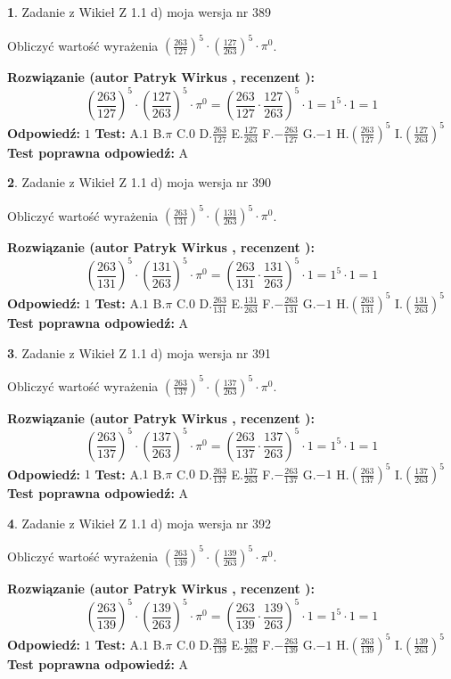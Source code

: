 \documentclass[12pt, a4paper]{article}
\theoremstyle{definition} %
\newtheorem{zad}{}
\newcommand{\zadStart}[1]{\begin{zad}#1\newline}
\newcommand{\zadStop}{\end{zad}}
\newcommand{\rozwStart}[2]{\noindent \textbf{Rozwiązanie (autor #1 , recenzent #2): }\newline}
\newcommand{\rozwStop}{\newline}
\newcommand{\odpStart}{\noindent \textbf{Odpowiedź:}\newline}
\newcommand{\odpStop}{\newline}
\newcommand{\testStart}{\noindent \textbf{Test:}\newline}
\newcommand{\testStop}{\newline}
\newcommand{\kluczStart}{\noindent \textbf{Test poprawna odpowiedź:}\newline}
\newcommand{\kluczStop}{\newline}
\begin{document}
\zadStart{Zadanie z Wikieł Z 1.1 d) moja wersja nr 389}

Obliczyć wartość wyrażenia $(\frac{263}{127})^{5} \cdot (\frac{127}{263})^{5} \cdot \pi^{0}$.
\zadStop
\rozwStart{Patryk Wirkus}{}
$$(\frac{263}{127})^{5} \cdot (\frac{127}{263})^{5} \cdot \pi^{0} = (\frac{263}{127} \cdot \frac{127}{263})^{5} \cdot 1 = 1^{5} \cdot 1 = 1$$
\rozwStop
\odpStart
$1$
\odpStop
\testStart
A.$1$ B.$\pi$ C.$0$ D.$\frac{263}{127}$ E.$\frac{127}{263}$
F.$-\frac{263}{127}$ G.$-1$
H.$(\frac{263}{127})^{5}$
I.$(\frac{127}{263})^{5}$
\testStop
\kluczStart
A
\kluczStop



\zadStart{Zadanie z Wikieł Z 1.1 d) moja wersja nr 390}

Obliczyć wartość wyrażenia $(\frac{263}{131})^{5} \cdot (\frac{131}{263})^{5} \cdot \pi^{0}$.
\zadStop
\rozwStart{Patryk Wirkus}{}
$$(\frac{263}{131})^{5} \cdot (\frac{131}{263})^{5} \cdot \pi^{0} = (\frac{263}{131} \cdot \frac{131}{263})^{5} \cdot 1 = 1^{5} \cdot 1 = 1$$
\rozwStop
\odpStart
$1$
\odpStop
\testStart
A.$1$ B.$\pi$ C.$0$ D.$\frac{263}{131}$ E.$\frac{131}{263}$
F.$-\frac{263}{131}$ G.$-1$
H.$(\frac{263}{131})^{5}$
I.$(\frac{131}{263})^{5}$
\testStop
\kluczStart
A
\kluczStop



\zadStart{Zadanie z Wikieł Z 1.1 d) moja wersja nr 391}

Obliczyć wartość wyrażenia $(\frac{263}{137})^{5} \cdot (\frac{137}{263})^{5} \cdot \pi^{0}$.
\zadStop
\rozwStart{Patryk Wirkus}{}
$$(\frac{263}{137})^{5} \cdot (\frac{137}{263})^{5} \cdot \pi^{0} = (\frac{263}{137} \cdot \frac{137}{263})^{5} \cdot 1 = 1^{5} \cdot 1 = 1$$
\rozwStop
\odpStart
$1$
\odpStop
\testStart
A.$1$ B.$\pi$ C.$0$ D.$\frac{263}{137}$ E.$\frac{137}{263}$
F.$-\frac{263}{137}$ G.$-1$
H.$(\frac{263}{137})^{5}$
I.$(\frac{137}{263})^{5}$
\testStop
\kluczStart
A
\kluczStop



\zadStart{Zadanie z Wikieł Z 1.1 d) moja wersja nr 392}

Obliczyć wartość wyrażenia $(\frac{263}{139})^{5} \cdot (\frac{139}{263})^{5} \cdot \pi^{0}$.
\zadStop
\rozwStart{Patryk Wirkus}{}
$$(\frac{263}{139})^{5} \cdot (\frac{139}{263})^{5} \cdot \pi^{0} = (\frac{263}{139} \cdot \frac{139}{263})^{5} \cdot 1 = 1^{5} \cdot 1 = 1$$
\rozwStop
\odpStart
$1$
\odpStop
\testStart
A.$1$ B.$\pi$ C.$0$ D.$\frac{263}{139}$ E.$\frac{139}{263}$
F.$-\frac{263}{139}$ G.$-1$
H.$(\frac{263}{139})^{5}$
I.$(\frac{139}{263})^{5}$
\testStop
\kluczStart
A
\kluczStop
\end{document}
